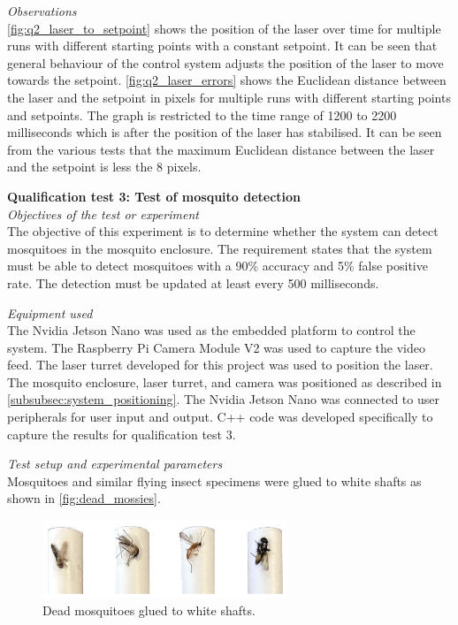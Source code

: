 \textit{Observations}\\
\autoref{fig:q2_laser_to_setpoint} shows the position of the laser over time for multiple runs with different starting points with a constant setpoint. It can be seen that general behaviour of the control system adjusts the position of the laser to move towards the setpoint. \autoref{fig:q2_laser_errors} shows the Euclidean distance between the laser and the setpoint in pixels for multiple runs with different starting points and setpoints. The graph is restricted to the time range of 1200 to 2200 milliseconds which is after the position of the laser has stabilised. It can be seen from the various tests that the maximum Euclidean distance between the laser and the setpoint is less the 8 pixels.

\FloatBarrier
\textbf{Qualification test 3: Test of mosquito detection}\\

\textit{Objectives of the test or experiment}\\
The objective of this experiment is to determine whether the system can detect mosquitoes in the mosquito enclosure. The requirement states that the system must be able to detect mosquitoes with a 90\% accuracy and 5\% false positive rate. The detection must be updated at least every 500 milliseconds.

\textit{Equipment used}\\
The Nvidia Jetson Nano was used as the embedded platform to control the system. The Raspberry Pi Camera Module V2 was used to capture the video feed. The laser turret developed for this project was used to position the laser. The mosquito enclosure, laser turret, and camera was positioned as described in \autoref{subsubsec:system_positioning}. The Nvidia Jetson Nano was connected to user peripherals for user input and output. C++ code was developed specifically to capture the results for qualification test 3.

\textit{Test setup and experimental parameters}\\
Mosquitoes and similar flying insect specimens were glued to white shafts as shown in \autoref{fig:dead_mossies}.
\begin{figure}[!htb]
  \centering
  \includegraphics[width=0.65\textwidth]{figures/results/googas.jpg}
  \caption{Dead mosquitoes glued to white shafts.}
  \label{fig:dead_mossies}
\end{figure}

